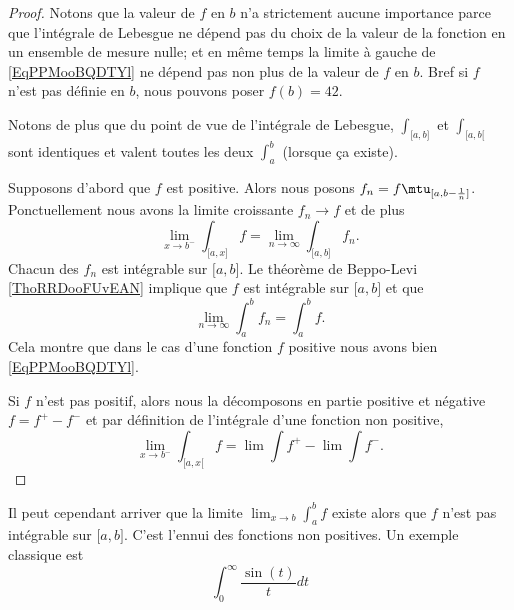 \begin{proof}
    Notons que la valeur de \( f\) en \( b\) n'a strictement aucune importance parce que l'intégrale de Lebesgue ne dépend pas du choix de la valeur de la fonction en un ensemble de mesure nulle; et en même temps la limite à gauche de \eqref{EqPPMooBQDTYl} ne dépend pas non plus de la valeur de \( f\) en \( b\). Bref si \( f\) n'est pas définie en \( b\), nous pouvons poser \( f(b)=42\).

    Notons de plus que du point de vue de l'intégrale de Lebesgue, \( \int_{\mathopen[ a , b \mathclose]}\) et \( \int_{\mathopen[ a , b [}\) sont identiques et valent toutes les deux \( \int_a^b\) (lorsque ça existe).

    Supposons d'abord que \( f\) est positive. Alors nous posons \( f_n=f\mtu_{\mathopen[ a , b-\frac{1}{ n } \mathclose]}\). Ponctuellement nous avons la limite croissante \( f_n\to f\) et de plus
    \begin{equation}
        \lim_{x\to b^-} \int_{\mathopen[ a , x \mathclose]}f=\lim_{n\to \infty} \int_{\mathopen[ a , b \mathclose]}f_n.
    \end{equation}
    Chacun des \( f_n\) est intégrable sur \( \mathopen[ a , b \mathclose]\). Le théorème de Beppo-Levi \ref{ThoRRDooFUvEAN} implique que \( f\) est intégrable sur \( \mathopen[ a , b \mathclose]\) et que
    \begin{equation}
        \lim_{n\to \infty} \int_a^bf_n=\int_a^bf.
    \end{equation}
    Cela montre que dans le cas d'une fonction \( f\) positive nous avons bien \eqref{EqPPMooBQDTYl}.

    Si \( f\) n'est pas positif, alors nous la décomposons en partie positive et négative \( f=f^+-f^{-}\) et par définition de l'intégrale d'une fonction non positive,
    \begin{equation}
        \lim_{x\to b^-} \int_{\mathopen[ a , x [}f=\lim\int f^{+}-\lim\int f^-.
    \end{equation}
\end{proof}

Il peut cependant arriver que la limite \( \lim_{x\to b} \int_a^bf\) existe alors que \( f\) n'est pas intégrable sur \( \mathopen[ a , b \mathclose]\). C'est l'ennui des fonctions non positives. Un exemple classique est
\begin{equation}\label{EqMMVooDSpgfz}
    \int_0^{\infty}\frac{ \sin(t) }{ t }dt
\end{equation}


